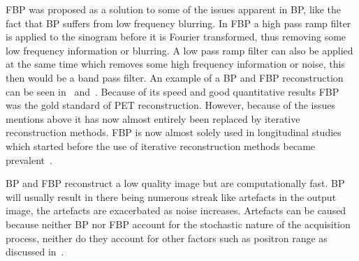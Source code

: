             \gls{FBP} was proposed as a solution to some of the issues apparent in \gls{BP}, like the fact that \gls{BP} suffers from low frequency blurring. In \gls{FBP} a high pass ramp filter is applied to the sinogram before it is Fourier transformed, thus removing some low frequency information or blurring. A low pass ramp filter can also be applied at the same time which removes some high frequency information or noise, this then would be a band pass filter. An example of a \gls{BP} and \gls{FBP} reconstruction can be seen in~ and~. Because of its speed and good quantitative results \gls{FBP} was the gold standard of \gls{PET} reconstruction. However, because of the issues mentions above it has now almost entirely been replaced by iterative reconstruction methods. \gls{FBP} is now almost solely used in longitudinal studies which started before the use of iterative reconstruction methods became prevalent~\parencite{FBPReviewBib, Tong2010_review}.
            
            \gls{BP} and \gls{FBP} reconstruct a low quality image but are computationally fast. \gls{BP} will usually result in there being numerous streak like artefacts in the output image, the artefacts are exacerbated as noise increases. Artefacts can be caused because neither \gls{BP} nor \gls{FBP} account for the stochastic nature of the acquisition process, neither do they account for other factors such as positron range as discussed in~.
            
            
